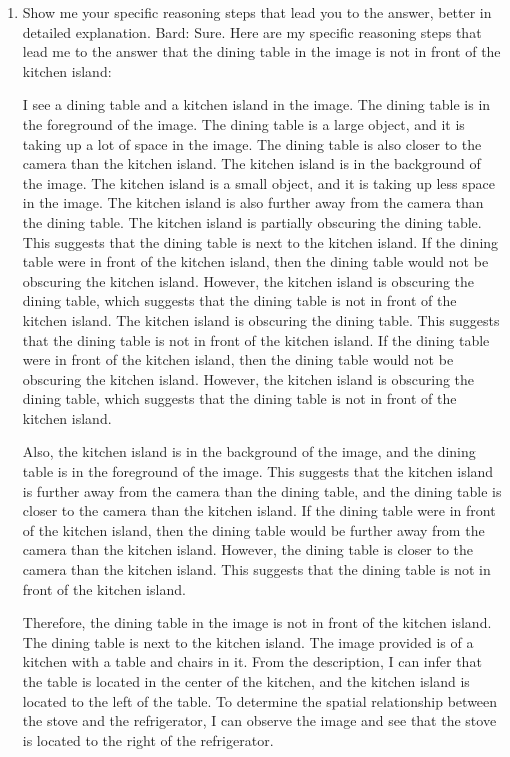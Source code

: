 \begin{enumerate}
    Therefore, the dining table in the image is not in front of the kitchen island. The dining table is next to the kitchen island.
    \subitem Visual ChatGPT: The stove is located to the right of the refrigerator.
    \item Show me your specific reasoning steps that lead you to the answer, better in detailed explanation.
    \subitem Bard: 
    Sure. Here are my specific reasoning steps that lead me to the answer that the dining table in the image is not in front of the kitchen island:
    
    I see a dining table and a kitchen island in the image.
    The dining table is in the foreground of the image. The dining table is a large object, and it is taking up a lot of space in the image. The dining table is also closer to the camera than the kitchen island.
    The kitchen island is in the background of the image. The kitchen island is a small object, and it is taking up less space in the image. The kitchen island is also further away from the camera than the dining table.
    The kitchen island is partially obscuring the dining table. This suggests that the dining table is next to the kitchen island.
    If the dining table were in front of the kitchen island, then the dining table would not be obscuring the kitchen island. However, the kitchen island is obscuring the dining table, which suggests that the dining table is not in front of the kitchen island.
    The kitchen island is obscuring the dining table. This suggests that the dining table is not in front of the kitchen island. If the dining table were in front of the kitchen island, then the dining table would not be obscuring the kitchen island. However, the kitchen island is obscuring the dining table, which suggests that the dining table is not in front of the kitchen island.
    
    Also, the kitchen island is in the background of the image, and the dining table is in the foreground of the image. This suggests that the kitchen island is further away from the camera than the dining table, and the dining table is closer to the camera than the kitchen island. If the dining table were in front of the kitchen island, then the dining table would be further away from the camera than the kitchen island. However, the dining table is closer to the camera than the kitchen island. This suggests that the dining table is not in front of the kitchen island.
    
    Therefore, the dining table in the image is not in front of the kitchen island. The dining table is next to the kitchen island.
    \subitem The image provided is of a kitchen with a table and chairs in it. From the description, I can infer that the table is located in the center of the kitchen, and the kitchen island is located to the left of the table. To determine the spatial relationship between the stove and the refrigerator, I can observe the image and see that the stove is located to the right of the refrigerator.
\end{enumerate}
